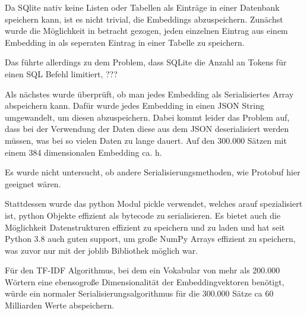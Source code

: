 Da SQlite nativ keine Listen oder Tabellen als Einträge in einer Datenbank speichern kann, ist es nicht trivial, die Embeddings abzuspeichern.
Zunächst wurde die Möglichkeit in betracht gezogen, jeden einzelnen Eintrag aus einem Embedding in als seperaten Eintrag in einer Tabelle zu speichern. 

Das führte allerdings zu dem Problem, dass SQLite die Anzahl an Tokens für einen SQL Befehl limitiert, ???

Als nächstes wurde überprüft, ob man jedes Embedding als Serialisiertes Array abspeichern kann.
Dafür wurde jedes Embedding in einen JSON String umgewandelt, um diesen abzuspeichern. 
Dabei kommt leider das Problem auf, dass bei der Verwendung der Daten diese aus dem JSON deserialisiert werden müssen, was bei so vielen Daten zu lange dauert.
Auf den 300.000 Sätzen mit einem 384 dimensionalen Embedding ca. h.

Es wurde nicht untersucht, ob andere Serialisierungsmethoden, wie Protobuf hier geeignet wären.

Stattdessen wurde das python Modul pickle verwendet, welches arauf spezialisiert ist, python Objekte effizient als bytecode zu serialisieren. 
Es bietet auch die Möglichkeit Datenstrukturen effizient zu speichern und zu laden und hat seit Python 3.8 auch guten support, um große NumPy Arrays effizient zu speichern, was zuvor nur mit der joblib Bibliothek möglich war.

Für den TF-IDF Algorithmus, bei dem ein Vokabular von mehr als 200.000 Wörtern eine ebensogroße Dimensionalität der Embeddingvektoren benötigt, würde ein normaler Serialisierungsalgorithmus für die 300.000 Sätze ca 60 Milliarden Werte abspeichern.


